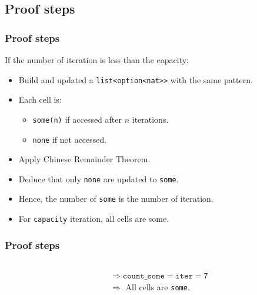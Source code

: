 \documentclass{beamer}
\begin{document}
\subsection{Proof steps}
\begin{frame}
	\frametitle{Proof steps}
	If the number of iteration is less than the capacity: 
	\begin{itemize}
		\item Build and updated a \texttt{list<option<nat>>} with the same pattern.
		\item Each cell is: 
			\begin{itemize}
				\item \texttt{some(n)} if accessed after $n$ iterations.
				\item \texttt{none} if not accessed.
			\end{itemize}
		\item Apply Chinese Remainder Theorem.
		\item Deduce that only \texttt{none} are updated to \texttt{some}.
		\item Hence, the number of \texttt{some} is the number of iteration.
		\item For \texttt{capacity} iteration, all cells are some.
	\end{itemize}
\end{frame}

\begin{frame}
	\frametitle{Proof steps}


	\begin{columns}
		\begin{column}{0.5\textwidth}
		\end{column}
		\begin{column}{0.5\textwidth}
			$\Rightarrow \mathtt{count\_some = iter = 7}$\\
			$\Rightarrow$ All cells are \texttt{some}.
		\end{column}
	\end{columns}
\end{frame}
\end{document}
